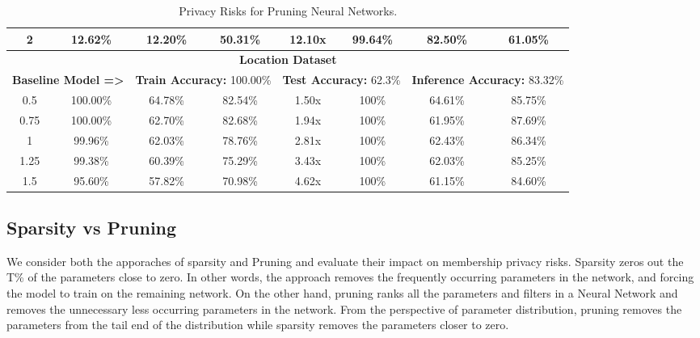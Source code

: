 \begin{table*}[!htb]
\begin{center}
\begin{tabular}{|c|c|c|c|c|c|c|c|}
2 & 12.62\% & 12.20\% & \cellcolor{green!25}50.31\% & 12.10x & 99.64\% & 82.50\% & \cellcolor{red!25}61.05\%\\
\hline
\hline
\multicolumn{8}{|c|}{\textbf{Location Dataset}}\\
\multicolumn{2}{|c}{\textbf{Baseline Model =>}} & \multicolumn{2}{c}{\textbf{Train Accuracy:} 100.00\%} & \multicolumn{2}{c}{\textbf{Test Accuracy:} 62.3\%} & \multicolumn{2}{c|}{\textbf{Inference Accuracy:} 83.32\%}\\
\hline
0.5 & 100.00\% & 64.78\% & \cellcolor{green!25}82.54\% & 1.50x & 100\% & 64.61\% & \cellcolor{red!25}85.75\%\\
0.75 & 100.00\% & 62.70\% & \cellcolor{green!25}82.68\% & 1.94x & 100\% & 61.95\% & \cellcolor{red!25}87.69\%\\
1 & 99.96\% & 62.03\% & \cellcolor{green!25}78.76\% & 2.81x & 100\% & 62.43\% & \cellcolor{red!25}86.34\%\\
1.25 & 99.38\% & 60.39\% & \cellcolor{green!25}75.29\% & 3.43x & 100\% & 62.03\% & \cellcolor{red!25}85.25\%\\
1.5 & 95.60\% & 57.82\% & \cellcolor{green!25}70.98\% & 4.62x & 100\% & 61.15\% & \cellcolor{red!25}84.60\%\\
\hline
\end{tabular}
\end{center}
\caption{Privacy Risks for Pruning Neural Networks.}
\label{fmnist_pruning}
\end{table*}










\subsection{Sparsity vs Pruning}

We consider both the apporaches of sparsity and Pruning and evaluate their impact on membership privacy risks.
Sparsity zeros out the T\% of the parameters close to zero. In other words, the approach removes the frequently occurring parameters in the network, and forcing the model to train on the remaining network.
On the other hand, pruning ranks all the parameters and filters in a Neural Network and removes the unnecessary less occurring parameters in the network.
From the perspective of parameter distribution, pruning removes the parameters from the tail end of the distribution while sparsity removes the parameters closer to zero.


